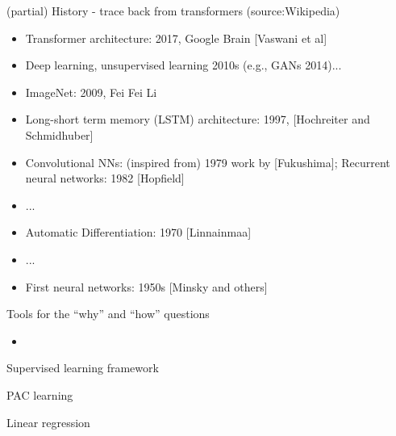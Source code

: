 \documentclass[final]{beamer}
\begin{document}
\begin{frame}{(partial) History - trace back from transformers (source:Wikipedia)}
	\begin{itemize}
		\item Transformer architecture: 2017, Google Brain [Vaswani et al]
		\item Deep learning, unsupervised learning 2010s (e.g., GANs 2014)...
		\item ImageNet: 2009, Fei Fei Li 
		\item Long-short term memory (LSTM) architecture: 1997, [Hochreiter and Schmidhuber]
		\item Convolutional NNs: (inspired from) 1979 work by [Fukushima];  Recurrent neural networks: 1982 [Hopfield]
		\item ...
		\item Automatic Differentiation: 1970 [Linnainmaa]
		\item ...
		\item First neural networks: 1950s [Minsky and others]
	\end{itemize}
\end{frame}
\begin{frame}{Tools for the ``why'' and ``how'' questions}
	\begin{itemize}
		\item 
	\end{itemize}
\end{frame}
\begin{frame}{Supervised learning framework}
\end{frame}
\begin{frame}{PAC learning}
\end{frame}
\begin{frame}{Linear regression}


\end{frame}
\end{document}
